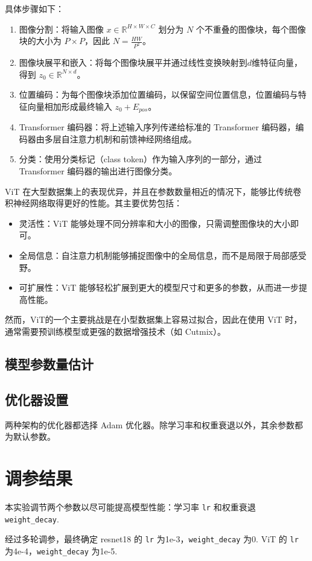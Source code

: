 \documentclass[notitlepage,cs4size,punct,oneside]{ctexrep}
\numberwithin{equation}{chapter}
\theoremstyle{mystyle}
\begin{document}
具体步骤如下：
\begin{enumerate}
    \item 图像分割：将输入图像 $x \in \mathbb{R}^{H \times W \times C}$ 划分为 $N$ 个不重叠的图像块，每个图像块的大小为 $P \times P$，因此 $N = \frac{HW}{P^2}$。
    \item 图像块展平和嵌入：将每个图像块展平并通过线性变换映射到$d$维特征向量，得到 $z_0 \in \mathbb{R}^{N \times d}$。
    \item 位置编码：为每个图像块添加位置编码，以保留空间位置信息，位置编码与特征向量相加形成最终输入 $z_0 + E_{pos}$。
    \item Transformer 编码器：将上述输入序列传递给标准的 Transformer 编码器，编码器由多层自注意力机制和前馈神经网络组成。
    \item 分类：使用分类标记（class token）作为输入序列的一部分，通过 Transformer 编码器的输出进行图像分类。
\end{enumerate}
ViT 在大型数据集上的表现优异，并且在参数数量相近的情况下，能够比传统卷积神经网络取得更好的性能。其主要优势包括：
\begin{itemize}
    \item 灵活性：ViT 能够处理不同分辨率和大小的图像，只需调整图像块的大小即可。
    \item 全局信息：自注意力机制能够捕捉图像中的全局信息，而不是局限于局部感受野。
    \item 可扩展性：ViT 能够轻松扩展到更大的模型尺寸和更多的参数，从而进一步提高性能。
\end{itemize}
然而，ViT的一个主要挑战是在小型数据集上容易过拟合，因此在使用 ViT 时，通常需要预训练模型或更强的数据增强技术（如 Cutmix）。

\subsection{模型参数量估计}


\subsection{优化器设置}
两种架构的优化器都选择 Adam 优化器。除学习率和权重衰退以外，其余参数都为默认参数。


\section{调参结果}
本实验调节两个参数以尽可能提高模型性能：学习率 \texttt{lr} 和权重衰退 \texttt{weight\_decay}.

经过多轮调参，最终确定 resnet18 的 \texttt{lr} 为1e-3，\texttt{weight\_decay} 为0. ViT 的 \texttt{lr} 为4e-4，\texttt{weight\_decay} 为1e-5.
\end{document}
